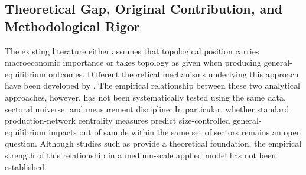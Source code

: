 % 

\subsection{Theoretical Gap, Original Contribution, and Methodological Rigor}
\label{sec:theoretical-gap}

The existing literature either assumes that topological position carries macroeconomic importance or takes topology as given when producing general-equilibrium outcomes. Different theoretical mechanisms underlying this approach have been developed by \citep{ref-hulten1978,ref-gabaix2011,ref-acemoglu2012,ref-carvalho2014,ref-baqaee-farhi2019a}. The empirical relationship between these two analytical approaches, however, has not been systematically tested using the same data, sectoral universe, and measurement discipline. In particular, whether standard production-network centrality measures predict size-controlled general-equilibrium impacts out of sample within the same set of sectors remains an open question. Although studies such as \citep{ref-baqaee-farhi2020a,ref-fadinger2022} provide a theoretical foundation, the empirical strength of this relationship in a medium-scale applied model has not been established.

